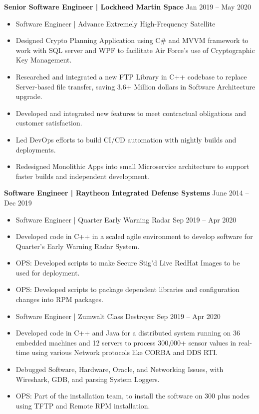\documentclass[letterpaper, 10pt]{article}
\begin{document}
\textbf{Senior Software Engineer | Lockheed Martin Space} \hfill Jan 2019 – May 2020
\begin{itemize}
    \item Software Engineer | Advance Extremely High-Frequency Satellite
    \item Designed Crypto Planning Application using C# and MVVM framework to work with SQL server and WPF to facilitate Air Force's use of Cryptographic Key Management.
    \item Researched and integrated a new FTP Library in C++ codebase to replace Server-based file transfer, saving 3.6+ Million dollars in Software Architecture upgrade.
    \item Developed and integrated new features to meet contractual obligations and customer satisfaction.
    \item Led DevOps efforts to build CI/CD automation with nightly builds and deployments.
    \item Redesigned Monolithic Apps into small Microservice architecture to support faster builds and independent development.
\end{itemize}

\textbf{Software Engineer | Raytheon Integrated Defense Systems} \hfill June 2014 – Dec 2019
\begin{itemize}
    \item Software Engineer | Quarter Early Warning Radar \hfill Sep 2019 – Apr 2020
    \item Developed code in C++ in a scaled agile environment to develop software for Quarter's Early Warning Radar System.
    \item OPS: Developed scripts to make Secure Stig'd Live RedHat Images to be used for deployment.
    \item OPS: Developed scripts to package dependent libraries and configuration changes into RPM packages.
    \item Software Engineer | Zumwalt Class Destroyer \hfill Sep 2019 – Apr 2020
    \item Developed code in C++ and Java for a distributed system running on 36 embedded machines and 12 servers to process 300,000+ sensor values in real-time using various Network protocols like CORBA and DDS RTI.
    \item Debugged Software, Hardware, Oracle, and Networking Issues, with Wireshark, GDB, and parsing System Loggers.
    \item OPS: Part of the installation team, to install the software on 300 plus nodes using TFTP and Remote RPM installation.
\end{itemize}
\end{document}
